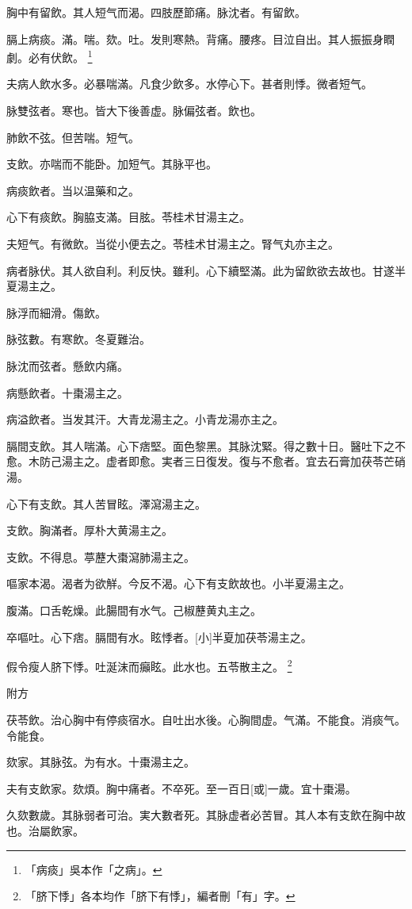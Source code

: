 \documentclass[12pt,oneside,UTF8,b5paper]{ctexbook}她她她她她她她
\begin{document}
胸中有留飲。其人短气而渴。四肢歷節痛。脉沈者。有留飲。

膈上病痰。滿。喘。欬。吐。发則寒熱。背痛。腰疼。目泣自出。其人振振身瞤劇。必有伏飲。
	\footnote{「病痰」吳本作「之病」。}

夫病人飲水多。必暴喘滿。凡食少飲多。水停心下。甚者則悸。微者短气。

脉雙弦者。寒也。皆大下後善虚。脉偏弦者。飲也。

肺飲不弦。但苦喘。短气。

支飲。亦喘而不能卧。加短气。其脉平也。

病痰飲者。当以温藥和之。

心下有痰飲。胸脇支滿。目胘。苓桂术甘湯主之。

夫短气。有微飲。当從小便去之。苓桂术甘湯主之。腎气丸亦主之。

病者脉伏。其人欲自利。利反快。雖利。心下續堅滿。此为留飲欲去故也。甘遂半夏湯主之。

脉浮而細滑。傷飲。

脉弦數。有寒飲。冬夏難治。

脉沈而弦者。懸飲内痛。

病懸飲者。十棗湯主之。

病溢飲者。当发其汗。大青龙湯主之。小青龙湯亦主之。

膈間支飲。其人喘滿。心下痞堅。面色黎黑。其脉沈緊。得之數十日。醫吐下之不愈。木防己湯主之。虚者即愈。実者三日復发。復与不愈者。宜去石膏加茯苓芒硝湯。

心下有支飲。其人苦冒眩。澤瀉湯主之。

支飲。胸滿者。厚朴大黄湯主之。

支飲。不得息。葶藶大棗瀉肺湯主之。

嘔家本渴。渴者为欲觧。今反不渴。心下有支飲故也。小半夏湯主之。

腹滿。口舌乾燥。此腸間有水气。己椒藶黄丸主之。

卒嘔吐。心下痞。膈間有水。眩悸者。[小]半夏加茯苓湯主之。

假令瘦人脐下悸。吐涎沫而癲眩。此水也。五苓散主之。
	\footnote{「脐下悸」各本均作「脐下有悸」，編者刪「有」字。}

附方

茯苓飲。治心胸中有停痰宿水。自吐出水後。心胸間虚。气滿。不能食。消痰气。令能食。

欬家。其脉弦。为有水。十棗湯主之。

夫有支飲家。欬煩。胸中痛者。不卒死。至一百日[或]一歲。宜十棗湯。

久欬數歲。其脉弱者可治。実大數者死。其脉虚者必苦冒。其人本有支飲在胸中故也。治屬飲家。
\end{document}
